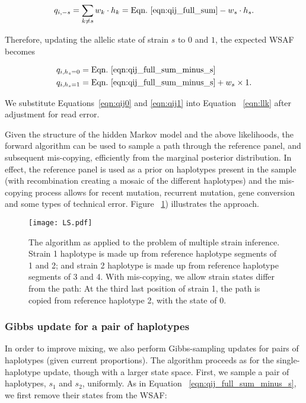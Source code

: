 \documentclass{bioinfo}
\begin{document}
\begin{equation}
q_{i,-s} = \sum_{k\neq s} w_k \cdot h_k = \textrm{Eqn.~\eqref{eqn:qij_full_sum}} -  w_s \cdot h_s. \label{eqn:qij_full_sum_minus_s}
\end{equation}

\noindent Therefore, updating the allelic state of strain $s$ to $0$ and $1$, the expected WSAF becomes

\begin{align}
q_{i,h_s=0} & = \textrm{Eqn.~\eqref{eqn:qij_full_sum_minus_s}} \label{eqn:qij0}\\
q_{i,h_s=1} & = \textrm{Eqn.~\eqref{eqn:qij_full_sum_minus_s}} + w_s \times 1. \label{eqn:qij1}
\end{align}

\noindent We substitute Equations~\eqref{eqn:qij0} and \eqref{eqn:qij1} into Equation ~\eqref{eqn:llk} after adjustment for read error.

Given the structure of the hidden Markov model and the above likelihoods, the forward algorithm can be used to sample a path through the reference panel, and subsequent mis-copying, efficiently from the marginal posterior distribution.  In effect, the reference panel is used as a prior on haplotypes present in the sample (with recombination creating a mosaic of the different haplotypes) and the mis-copying process allows for recent mutation, recurrent mutation, gene conversion and some types of technical error.  Figure ~\ref{fig:ls}) illustrates the approach.


\begin{figure}[tbh]
\centering
\texttt{[image: LS.pdf]}
\caption{The \citet{Li2003} algorithm as applied to the problem of multiple strain inference. Strain 1 haplotype is made up from reference haplotype segments of 1 and 2; and strain 2 haplotype is made up from reference haplotype segments of 3 and 4. With mis-copying, we allow strain states differ from the path: At the third last position of strain 1, the path is copied from reference haplotype 2, with the state of 0.}
\label{fig:ls}
\end{figure}





\subsubsection{Gibbs update for a pair of haplotypes}\label{sec:deconvolute}

In order to improve mixing, we also perform Gibbs-sampling updates for pairs of haplotypes (given current proportions). The algorithm proceeds as for the single-haplotype update, though with a larger state space.  First, we sample a pair of haplotypes, $s_1$ and $s_2$, uniformly. As in Equation ~\eqref{eqn:qij_full_sum_minus_s}, we first remove their states from the WSAF:
\end{document}
